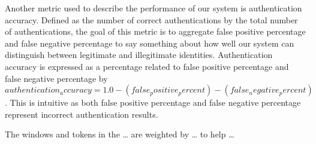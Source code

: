 
Another metric used to describe the performance of our system
is authentication accuracy.
%
Defined as the 
number of correct authentications by
the total number of authentications,
the goal of this metric is to
aggregate
false positive percentage and
false negative percentage 
to say something about how well our system can distinguish between
legitimate and illegitimate identities.
%
Authentication accuracy is 
expressed as a percentage
related to 
false positive percentage and
false negative percentage by
$authentication_accuracy = 1.0 - (false_positive_percent) - (false_negative_percent)$.
%
This is intuitive as both 
false positive percentage and
false negative percentage 
represent incorrect authentication results.



%





%
The windows and tokens in the \dots 
are weighted by \dots
to help \dots



